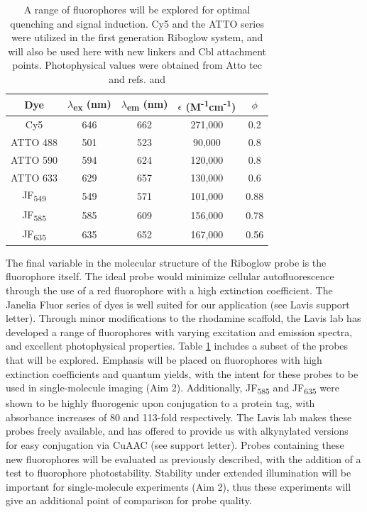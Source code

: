 \begin{table}
\caption{A range of fluorophores will be explored for optimal quenching and signal induction. Cy5 and the ATTO series were utilized in the first generation Riboglow system, and will also be used here with new linkers and Cbl attachment points. Photophysical values were obtained from Atto tec and refs. \cite{BraselmannDevelopmentriboswitchbasedplatform2017} and \cite{Grimmgeneralmethodfinetune2017}}\label{fluorophores}
\begin{tabular}{c|cccc}
  \toprule
 Dye &  $\lambda$\textsubscript{ex} (nm) &  $\lambda$\textsubscript{em} (nm) &  $\epsilon$ (M\textsuperscript{-1}cm\textsuperscript{-1}) &  $\phi$ \\\toprule
Cy5 & 646 & 662 & 271,000 & 0.2\\
ATTO 488 & 501 & 523 & 90,000 & 0.8\\
ATTO 590 & 594 & 624 & 120,000 & 0.8\\
ATTO 633 & 629 & 657 & 130,000 & 0.6\\  \hline
JF\textsubscript{549} & 549 & 571 & 101,000 & 0.88\\
JF\textsubscript{585} & 585 & 609 & 156,000 & 0.78\\
JF\textsubscript{635} & 635 & 652 & 167,000 & 0.56\\
\bottomrule
\end{tabular}
\end{table}

The final variable in the molecular structure of the Riboglow probe is the fluorophore itself. The ideal probe would minimize cellular autofluorescence through the use of a red fluorophore with a high extinction coefficient. The Janelia Fluor series of dyes is well suited for our application (see Lavis support letter)\cite{Grimmgeneralmethodfinetune2017,Grimmgeneralmethodimprove2015}. Through minor modifications to the rhodamine scaffold, the Lavis lab has developed a range of fluorophores with varying excitation and emission spectra, and excellent photophysical properties.
Table \ref{fluorophores} includes a subset of the probes that will be explored.
Emphasis will be placed on fluorophores with high extinction coefficients and quantum yields, with the intent for these probes to be used in single-molecule imaging (Aim 2).
Additionally, JF\textsubscript{585} and JF\textsubscript{635} were shown to be highly fluorogenic upon conjugation to a protein tag, with absorbance increases of 80 and 113-fold respectively\cite{Grimmgeneralmethodfinetune2017}.
The Lavis lab makes these probes freely available, and has offered to provide us with alkynylated versions for easy conjugation via CuAAC (see support letter).
Probes containing these new fluorophores will be evaluated as previously described, with the addition of a test to fluorophore photostability.
Stability under extended illumination will be important for single-molecule experiments (Aim 2), thus these experiments will give an additional point of comparison for probe quality.

